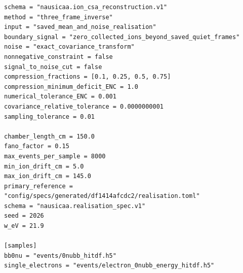 \documentclass[11pt,a4paper]{article}
\begin{document}
\begin{Verbatim}[breaklines,breakanywhere,fontsize=\footnotesize]
schema = "nausicaa.ion_csa_reconstruction.v1"
method = "three_frame_inverse"
input = "saved_mean_and_noise_realisation"
boundary_signal = "zero_collected_ions_beyond_saved_quiet_frames"
noise = "exact_covariance_transform"
nonnegative_constraint = false
signal_to_noise_cut = false
compression_fractions = [0.1, 0.25, 0.5, 0.75]
compression_minimum_deficit_ENC = 1.0
numerical_tolerance_ENC = 0.001
covariance_relative_tolerance = 0.0000000001
sampling_tolerance = 0.01

chamber_length_cm = 150.0
fano_factor = 0.15
max_events_per_sample = 8000
min_ion_drift_cm = 5.0
max_ion_drift_cm = 145.0
primary_reference = "config/specs/generated/df1414afcdc2/realisation.toml"
schema = "nausicaa.realisation_spec.v1"
seed = 2026
w_eV = 21.9

[samples]
bb0nu = "events/0nubb_hitdf.h5"
single_electrons = "events/electron_0nubb_energy_hitdf.h5"

\end{Verbatim}
\end{document}
